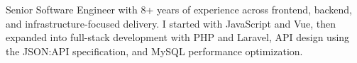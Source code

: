 \begin{cvparagraph}
    Senior Software Engineer with 8+ years of experience across frontend, backend, and infrastructure-focused delivery. I started with JavaScript and Vue, then expanded into full-stack development with PHP and Laravel, API design using the JSON:API specification, and MySQL performance optimization.
\end{cvparagraph}